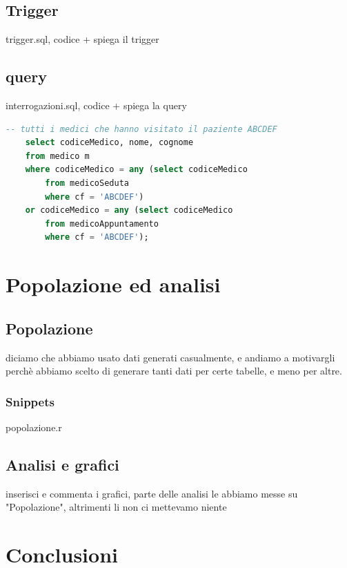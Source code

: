 \documentclass[11pt,a4paper]{article}
\begin{document}
\subsection{Trigger}
\label{trig:trigger1}
trigger.sql, codice + spiega il trigger
\subsection{query}
interrogazioni.sql, codice + spiega la query
\begin{lstlisting}[language=SQL]
    -- tutti i medici che hanno visitato il paziente ABCDEF
    select codiceMedico, nome, cognome
    from medico m
    where codiceMedico = any (select codiceMedico
        from medicoSeduta
        where cf = 'ABCDEF')
    or codiceMedico = any (select codiceMedico
        from medicoAppuntamento
        where cf = 'ABCDEF');
\end{lstlisting}


\section{Popolazione ed analisi}
\subsection{Popolazione}
\label{pop:popolazione}
diciamo che abbiamo usato dati generati casualmente, e andiamo a motivargli perchè abbiamo scelto di generare 
tanti dati per certe tabelle, e meno per altre.
\subsubsection{Snippets}
popolazione.r
\subsection{Analisi e grafici}
inserisci e commenta i grafici, parte delle analisi le abbiamo messe su "Popolazione", altrimenti li non ci mettevamo niente

\section{Conclusioni}
\end{document}
